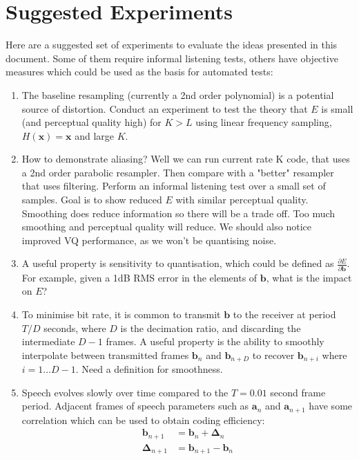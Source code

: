 \documentclass{article}
\begin{document}
\section{Suggested Experiments}
 
Here are a suggested set of experiments to evaluate the ideas presented in this document.  Some of them require informal listening tests, others have objective measures which could be used as the basis for automated tests:

\begin{enumerate}

\item The baseline resampling (currently a 2nd order polynomial) is a potential source of distortion.  Conduct an experiment to test the theory that $E$ is small (and perceptual quality high) for $K>L$ using linear frequency sampling, $H(\mathbf{x})=\mathbf{x}$ and large $K$.

\item How to demonstrate aliasing?  Well we can run current rate K code, that uses a 2nd order parabolic resampler.  Then compare with a "better" resampler that uses filtering.  Perform an informal listening test over a small set of samples.  Goal is to show reduced $E$ with similar perceptual quality.  Smoothing does reduce information so there will be a trade off.  Too much smoothing and perceptual quality will reduce.  We should also notice improved VQ performance, as we won't be quantising noise.

\item A useful property is sensitivity to quantisation, which could be defined as $\frac{\partial E}{\partial \mathbf{b}}$. For example, given a 1dB RMS error in the elements of $\mathbf{b}$, what is the impact on $E$?

\item To minimise bit rate, it is common to transmit $\mathbf{b}$ to the receiver at period $T/D$ seconds, where $D$ is the decimation ratio, and discarding the intermediate $D-1$ frames. A useful property is the ability to smoothly interpolate between transmitted frames $\mathbf{b}_n$ and $\mathbf{b}_{n+D}$ to recover $\mathbf{b}_{n+i}$ where $i=1 \ldots D-1$.  Need a definition for smoothness.

\item Speech evolves slowly over time compared to the $T=0.01$ second frame period.  Adjacent frames of speech parameters such as $\mathbf{a}_n$ and $\mathbf{a}_{n+1}$ have some correlation which can be used to obtain coding efficiency:
\begin{equation} \label{eq:delta}
\begin{split}
\mathbf{b}_{n+1} & = \mathbf{b}_{n} + \mathbf{\Delta}_n \\
\mathbf{\Delta}_{n+1} & = \mathbf{b}_{n+1} - \mathbf{b}_{n}
\end{split}
\end{equation}


\end{enumerate}
\end{document}
